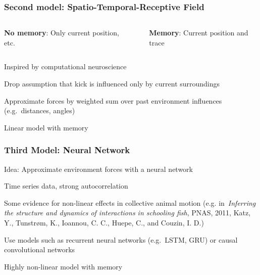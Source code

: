 \documentclass{beamer}
\begin{document}
\begin{frame}
  \frametitle{Second model: Spatio-Temporal-Receptive Field}
 \begin{columns}
   \begin{column}{0.5\textwidth}

 \textbf{No memory}: Only current position, etc.
\end{column}~\begin{column}{0.5\textwidth}

 \textbf{Memory}: Current position and trace
   \end{column}
 \end{columns}
  Inspired by computational neuroscience

  Drop assumption that kick is influenced only by current surroundings
  
  Approximate forces by weighted sum over past environment influences (e.g.\ distances, angles)

  Linear model with memory
\end{frame}

\begin{frame}
  \frametitle{Third Model: Neural Network}
  Idea: Approximate environment forces with a neural network

  Time series data, strong autocorrelation

  Some evidence for non-linear effects in collective animal motion
  (e.g. in\ \textit{Inferring the structure and dynamics of interactions in schooling fish}, PNAS, 2011, {\tiny Katz, Y., Tunstrøm, K., Ioannou, C. C., Huepe, C., and Couzin, I. D.})

  Use models such as recurrent neural networks (e.g.\ LSTM, GRU) or causal convolutional networks
  
  Highly non-linear model with memory
\end{frame}
\end{document}
